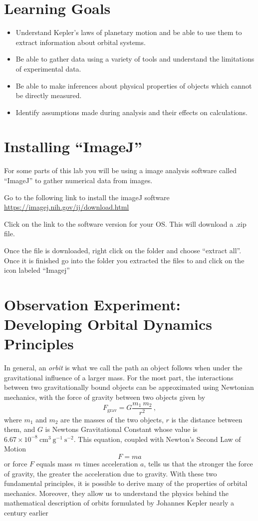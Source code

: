 \section{Learning Goals}
\begin{itemize}
	\item Understand Kepler's laws of planetary motion and be able to use them to extract information about orbital systems.
	\item Be able to gather data using a variety of tools and understand the limitations of experimental data.
	\item Be able to make inferences about physical properties of objects which cannot be directly measured.
	\item Identify assumptions made during analysis and their effects on calculations.
\end{itemize}

\section{Installing ``ImageJ''}
For some parts of this lab you will be using a image analysis software called ``ImageJ'' to gather numerical data from images.
\begin{steps}
	\item Go to the following link to install the imageJ software \url{https://imagej.nih.gov/ij/download.html}
	\item Click on the link to the software version for your OS. This will download a .zip file.
	\item Once the file is downloaded, right click on the folder and choose ``extract all''. Once it is finished go into the folder you extracted the files to and click on the icon labeled ``Imagej''
\end{steps}

\section{Observation Experiment: Developing Orbital Dynamics Principles}
In general, an \textit{orbit} is what we call the path an object follows when under the gravitational influence of a larger mass. For the most part, the interactions between two gravitationally bound objects can be approximated using Newtonian mechanics, with the force of gravity between two objects given by 
\begin{equation}\label{gc:eq:newton}
	F_\textrm{grav} = G \frac{m_1 \: m_2}{r^2} \, ,
\end{equation}
where $m_1$ and $m_2$ are the masses of the two objects, $r$ is the distance between them, and $G$ is Newtons Gravitational Constant whose value is $6.67 \times 10^{-8}\:\textrm{cm}^3 \: \textrm{g}^{-1} \: \textrm{s}^{-2}$. This equation, coupled with Newton's Second Law of Motion $$F = ma$$ or force $F$ equals mass $m$ times acceleration $a$, tells us that the stronger the force of gravity, the greater the acceleration due to gravity. With these two fundamental principles, it is possible to derive many of the properties of orbital mechanics. Moreover, they allow us to understand the physics behind the mathematical description of orbits formulated by Johannes Kepler nearly a century earlier

